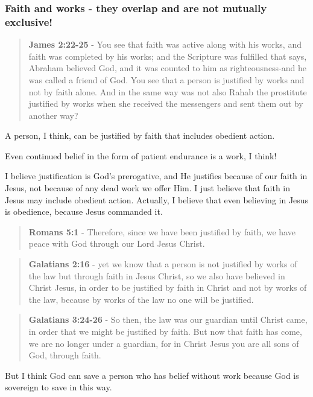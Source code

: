\documentclass[11pt]{article}
\begin{document}
\subsubsection{Faith and works - they overlap and are \textbf{not} mutually exclusive!}
\label{sec:org47e9923}
\begin{quote}
\textbf{James 2:22-25} - You see that faith was active along with his works, and faith was completed by his works; and the Scripture was fulfilled that says, Abraham believed God, and it was counted to him as righteousness-and he was called a friend of God. You see that a person is justified by works and not by faith alone. And in the same way was not also Rahab the prostitute justified by works when she received the messengers and sent them out by another way?
\end{quote}

A person, I think, can be justified by faith that includes obedient action.

Even continued belief in the form of patient endurance is a work, I think!

I believe justification is God's prerogative, and He justifies because of our faith in Jesus, not because of any dead work we offer Him. I just believe that faith in Jesus may include obedient action.
Actually, I believe that even believing in Jesus is obedience, because Jesus commanded it.

\begin{quote}
\textbf{Romans 5:1} - Therefore, since we have been justified by faith, we have peace with God through our Lord Jesus Christ.
\end{quote}

\begin{quote}
\textbf{Galatians 2:16} - yet we know that a person is not justified by works of the law but through faith in Jesus Christ, so we also have believed in Christ Jesus, in order to be justified by faith in Christ and not by works of the law, because by works of the law no one will be justified.
\end{quote}

\begin{quote}
\textbf{Galatians 3:24-26} - So then, the law was our guardian until Christ came, in order that we might be justified by faith. But now that faith has come, we are no longer under a guardian, for in Christ Jesus you are all sons of God, through faith.
\end{quote}

But I think God can save a person who has belief without work because God is sovereign to save in this way.
\end{document}
